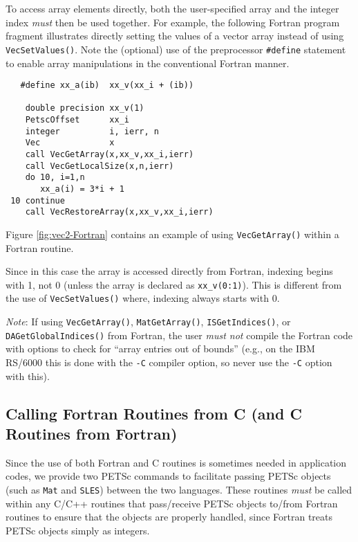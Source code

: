 {To access array elements directly, both the user-specified array and
the integer index {\em must} then be used together.  
For example, the following Fortran program fragment illustrates
directly setting the values of a vector array instead of using {\tt
VecSetValues()}.  Note the (optional) use of the preprocessor 
{\tt \#define} statement to enable array manipulations in the conventional
Fortran manner.
\begin{verbatim}
   #define xx_a(ib)  xx_v(xx_i + (ib))

    double precision xx_v(1)
    PetscOffset      xx_i
    integer          i, ierr, n
    Vec              x
    call VecGetArray(x,xx_v,xx_i,ierr)
    call VecGetLocalSize(x,n,ierr)
    do 10, i=1,n
       xx_a(i) = 3*i + 1
 10 continue
    call VecRestoreArray(x,xx_v,xx_i,ierr)
\end{verbatim}
Figure \ref{fig:vec2-Fortran} contains an example of using {\tt VecGetArray()}
within a Fortran routine.

Since in this case the array is accessed directly from Fortran,
indexing begins with 1, not 0 (unless the array is declared as {\tt xx\_v(0:1)}).
This is different from the use of {\tt VecSetValues()}
where, indexing always starts with 0.

{\em Note}: If using {\tt VecGetArray()}, {\tt MatGetArray()}, {\tt ISGetIndices()},
or {\tt DAGetGlobalIndices()}
from Fortran, the user {\em must not} compile the Fortran code with options 
to check for ``array entries out of bounds'' (e.g., on the IBM RS/6000 this 
is done with the {\tt -C} compiler option, so never use the {\tt -C} option with this).

\subsection{Calling Fortran Routines from C (and C Routines from Fortran)}

Since the use of both Fortran and C routines is sometimes needed in
application codes, we provide two PETSc commands to facilitate passing
PETSc objects (such as {\tt Mat} and {\tt SLES}) between the two
languages.  These routines {\em must} be called within any C/C++
routines that pass/receive PETSc objects to/from Fortran routines to
ensure that the objects are properly handled, since Fortran treats PETSc
objects simply as integers.

}
